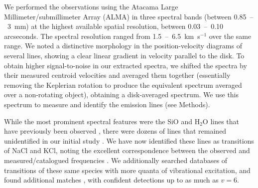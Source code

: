 \documentclass[12pt]{article}
\newcommand{\bam}[1]{\textcolor{green!65!black}{\textbf{[BAM: #1]}}}
\newcommand{\water}{H$_{2}$O\xspace}		%
\newcommand{\kms}{\textrm{km~s}\ensuremath{^{-1}}\xspace}	%
\begin{document}

We performed the observations using the Atacama Large Millimeter/submillimeter
Array (ALMA) in three spectral bands (between 0.85~--~3~mm) at the highest
available spatial resolution, between 0.03~--~0.10 arcseconds. The
spectral resolution ranged from 1.5~--~6.5~\kms over the same range.  We noted a
distinctive morphology in the position-velocity diagrams of several lines,
showing a clear linear gradient in velocity parallel to the disk. To obtain
higher signal-to-noise in our extracted spectra, we shifted the spectra by
their measured centroid velocities and averaged them together (essentially
removing  the Keplerian rotation to produce the equivalent spectrum averaged
over a non-rotating object), obtaining a
disk-averaged spectrum.  We use this spectrum to measure and  identify the
emission lines (see Methods).


While the most prominent spectral features were the SiO and \water lines that
have previously been observed \cite{Goddi2013a,Hirota2014a}, there were dozens
of lines that remained unidentified in our initial study \cite{Ginsburg2018b}.
We have now identified these lines as transitions of NaCl and KCl, noting the
excellent correspondence between the observed and measured/catalogued
frequencies \cite{Caris2002a,Caris2004a,Muller2005a,Lovas2005a,Pickett1998a}.
We additionally searched databases of transitions of these same species with
more quanta of vibrational excitation, and found additional matches
\cite{Barton2014a,Cabezas2016a}, with confident detections up to as much as
$v=6$.
\end{document}
